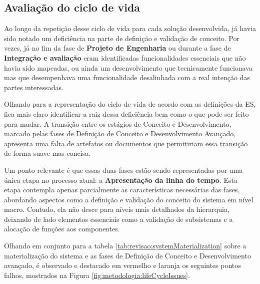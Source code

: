 	\subsection{Avaliação do ciclo de vida}

	Ao longo da repetição desse ciclo de vida para cada solução desenvolvida, já havia sido notado um deficiência
	na parte de definição e validação de conceito. Por vezes, já no fim da fase de \textbf{Projeto de Engenharia} ou durante a fase de \textbf{Integração e avaliação}
	eram identificadas funcionalidades essenciais que não havia sido mapeadas, ou ainda um desenvolvimento que tecnicamente funcionava mas que desempenhava uma 
	funcionalidade desalinhada com a real intenção das partes interessadas.

	Olhando para a representação do ciclo de vida de acordo com as definições da ES, fica mais claro identificar a raiz dessa deficiência bem como o que
	pode ser feito para mudar. A transição entre os estágios de Conceito e Desenvolvimento, marcado pelas fases de Definição de Conceito e Desenvolvimento Avançado, apresenta
	uma falta de artefatos ou documentos que permitiriam essa transição de forma suave mas concisa.

	Um ponto relevante é que essas duas fases estão sendo representadas por uma única etapa 
	no processo atual: a \textbf{Apresentação da linha do tempo}. Esta etapa contempla 
	apenas parcialmente as características necessárias das fases, abordando aspectos 
	como a definição e validação do conceito do sistema em nível macro. Contudo, ela não 
	desce para níveis mais detalhados da hierarquia, deixando de lado elementos essenciais 
	como a validação de subsistemas e a alocação de funções aos componentes.

	Olhando em conjunto para a tabela \ref{tab:revisao:systemMaterialization} sobre a materialização do sistema e as fases de Definição de Conceito e Desenvolvimento avançado,
	é observado e destacado em vermelho e laranja os seguintes pontos falhos, mostrados na Figura \ref{fig:metodologia:lifeCycleIssues}.

